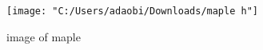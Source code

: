 \documentclass{article}
\begin{document}
\begin{figure}
	\texttt{[image: "C:/Users/adaobi/Downloads/maple h"]}
	\caption{image of maple}
	\label{fig:maple-h}
\end{figure}
\end{document}
